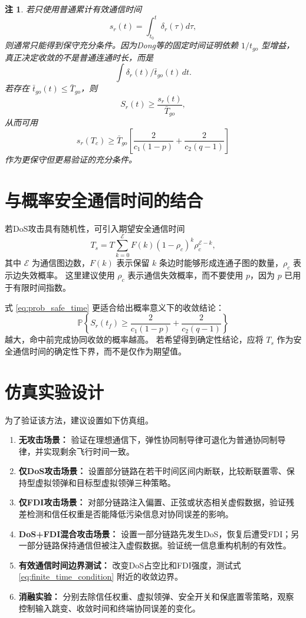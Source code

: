 \documentclass[UTF8,a4paper,11pt]{ctexart}
\newtheorem{remark}{注}
\begin{document}
\begin{remark}
若只使用普通累计有效通信时间
\[
s_r(t)=\int_{t_0}^{t}\delta_r(\tau)d\tau,
\]
则通常只能得到保守充分条件。因为Dong等的固定时间证明依赖 $1/t_{go}$ 型增益，真正决定收敛的不是普通连通时长，而是
\[
\int \delta_r(t)/\bar t_{go}(t)\,dt.
\]
若存在 $\bar t_{go}(t)\le \bar T_{go}$，则
\[
S_r(t)\ge \frac{s_r(t)}{\bar T_{go}},
\]
从而可用
\[
s_r(T_c)
\ge
\bar T_{go}
\left[
\frac{2}{c_1(1-p)}
+
\frac{2}{c_2(q-1)}
\right]
\]
作为更保守但更易验证的充分条件。
\end{remark}

\section{与概率安全通信时间的结合}

若DoS攻击具有随机性，可引入期望安全通信时间
\begin{equation}
T_s
=
T\sum_{k=0}^{\mathcal{E}}
F(k)(1-\rho_c)^k\rho_c^{\mathcal{E}-k},
\label{eq:prob_safe_time}
\end{equation}
其中 $\mathcal{E}$ 为通信图边数，$F(k)$ 表示保留 $k$ 条边时能够形成连通子图的数量，$\rho_c$ 表示边失效概率。
这里建议使用 $\rho_c$ 表示通信失效概率，而不要使用 $p$，因为 $p$ 已用于有限时间指数。

式 \eqref{eq:prob_safe_time} 更适合给出概率意义下的收敛结论：
\[
\mathbb{P}
\left\{
S_r(t_f)
\ge
\frac{2}{c_1(1-p)}
+
\frac{2}{c_2(q-1)}
\right\}
\]
越大，命中前完成协同收敛的概率越高。
若希望得到确定性结论，应将 $T_s$ 作为安全通信时间的确定性下界，而不是仅作为期望值。

\section{仿真实验设计}

为了验证该方法，建议设置如下仿真组。

\begin{enumerate}
\item \textbf{无攻击场景：}
验证在理想通信下，弹性协同制导律可退化为普通协同制导律，并实现剩余飞行时间一致。

\item \textbf{仅DoS攻击场景：}
设置部分链路在若干时间区间内断联，比较断联置零、保持型虚拟领弹和目标型虚拟领弹三种策略。

\item \textbf{仅FDI攻击场景：}
对部分链路注入偏置、正弦或状态相关虚假数据，验证残差检测和信任权重是否能降低污染信息对协同误差的影响。

\item \textbf{DoS+FDI混合攻击场景：}
设置一部分链路先发生DoS，恢复后遭受FDI；另一部分链路保持通信但被注入虚假数据。验证统一信息重构机制的有效性。

\item \textbf{有效通信时间边界测试：}
改变DoS占空比和FDI强度，测试式 \eqref{eq:finite_time_condition} 附近的收敛边界。

\item \textbf{消融实验：}
分别去除信任权重、虚拟领弹、安全开关和保底置零策略，观察控制输入跳变、收敛时间和终端协同误差的变化。
\end{enumerate}
\end{document}
